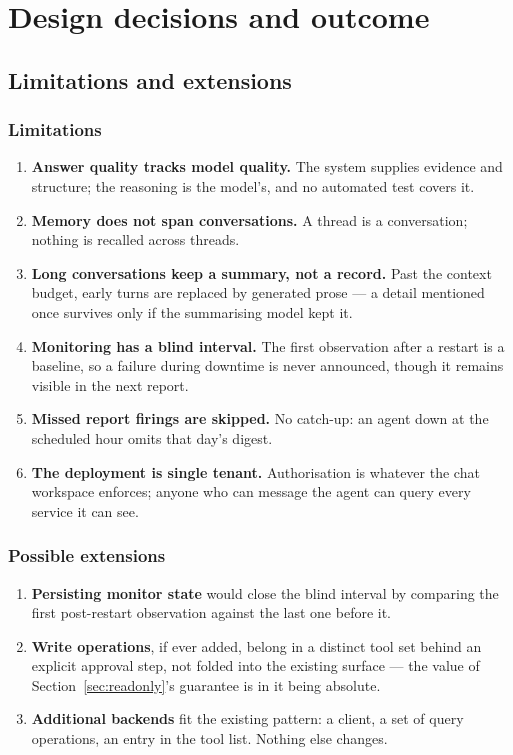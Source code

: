 \documentclass[11pt,a4paper]{article}
\let\stdsection\section
\renewcommand{\section}{\clearpage\stdsection}
\begin{document}
\section{Design decisions and outcome}
\label{sec:decisions}

\subsection{Limitations and extensions}

\subsubsection{Limitations}

\begin{enumerate}
  \item \textbf{Answer quality tracks model quality.} The system supplies evidence
        and structure; the reasoning is the model's, and no automated test covers it.
  \item \textbf{Memory does not span conversations.} A thread is a conversation;
        nothing is recalled across threads.
  \item \textbf{Long conversations keep a summary, not a record.} Past the context
        budget, early turns are replaced by generated prose --- a detail mentioned
        once survives only if the summarising model kept it.
  \item \textbf{Monitoring has a blind interval.} The first observation after a
        restart is a baseline, so a failure during downtime is never announced,
        though it remains visible in the next report.
  \item \textbf{Missed report firings are skipped.} No catch-up: an agent down at
        the scheduled hour omits that day's digest.
  \item \textbf{The deployment is single tenant.} Authorisation is whatever the chat
        workspace enforces; anyone who can message the agent can query every service
        it can see.
\end{enumerate}

\subsubsection{Possible extensions}

\begin{enumerate}
  \item \textbf{Persisting monitor state} would close the blind interval by comparing
        the first post-restart observation against the last one before it.
  \item \textbf{Write operations}, if ever added, belong in a distinct tool set
        behind an explicit approval step, not folded into the existing surface --- the
        value of Section~\ref{sec:readonly}'s guarantee is in it being absolute.
  \item \textbf{Additional backends} fit the existing pattern: a client, a set of
        query operations, an entry in the tool list. Nothing else changes.
\end{enumerate}
\end{document}

